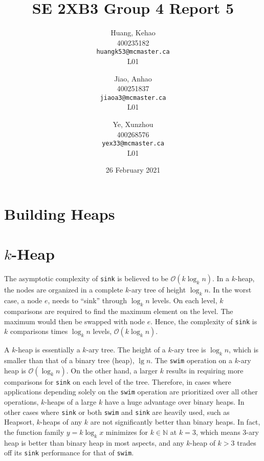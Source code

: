 \documentclass[titlepage, 12pt]{article}
\title{SE 2XB3 Group 4 Report 5}
\author{
  Huang, Kehao \\
  400235182 \\
  \texttt{huangk53@mcmaster.ca} \\
  L01
  \and
  Jiao, Anhao \\
  400251837 \\
  \texttt{jiaoa3@mcmaster.ca} \\
  L01
  \and
  Ye, Xunzhou \\
  400268576 \\
  \texttt{yex33@mcmaster.ca} \\
  L01
}
\date{26 February 2021}
\begin{document}
\maketitle{}

\newpage{}

\section{Building Heaps}
\label{sec:build}

\section{\(k\)-Heap}
\label{sec:kheap}

The asymptotic complexity of \texttt{sink} is believed to be \(\mathcal{O}(k
\log_{k}{n})\). In a \(k\)-heap, the nodes are organized in a complete \(k\)-ary
tree of height \(\log_{k}{n}\). In the worst case, a node \(e\), needs to “sink”
through \(\log_{k}{n}\) levels. On each level, \(k\) comparisons are required to
find the maximum element on the level. The maximum would then be swapped with
node \(e\). Hence, the complexity of \texttt{sink} is \(k\) comparisons times
\(\log_{k}{n}\) levels, \(\mathcal{O}(k \log_{k}{n})\).

A \(k\)-heap is essentially a \(k\)-ary tree. The height of a \(k\)-ary tree is
\(\log_{k}{n}\), which is smaller than that of a binary tree (heap), \(\lg{n}\).
The \texttt{swim} operation on a \(k\)-ary heap is \(\mathcal{O}(\log_{k}{n})\).
On the other hand, a larger \(k\) results in requiring more comparisons for
\texttt{sink} on each level of the tree. Therefore, in cases where applications
depending solely on the \texttt{swim} operation are prioritized over all other
operations, \(k\)-heaps of a large \(k\) have a huge advantage over binary
heaps. In other cases where \texttt{sink} or both \texttt{swim} and
\texttt{sink} are heavily used, such as Heapsort, \(k\)-heaps of any \(k\) are
not significantly better than binary heaps. In fact, the function family \(y =
k\log_{k}{x}\) minimizes for \(k \in \mathbb{N}\) at \(k = 3\), which means
3-ary heap is better than binary heap in most aspects, and any \(k\)-heap of \(k
> 3\) trades off its \texttt{sink} performance for that of \texttt{swim}.
\end{document}
